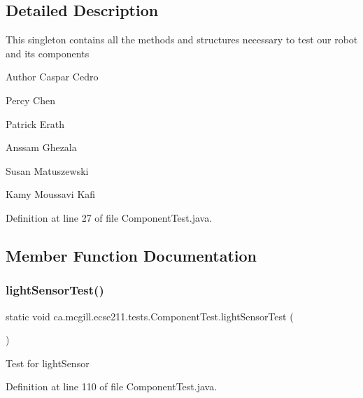\subsection{Detailed Description}
This singleton contains all the methods and structures necessary to test our robot and its components

\begin{DoxyAuthor}{Author}
Caspar Cedro 

Percy Chen 

Patrick Erath 

Anssam Ghezala 

Susan Matuszewski 

Kamy Moussavi Kafi 
\end{DoxyAuthor}


Definition at line 27 of file Component\+Test.\+java.



\subsection{Member Function Documentation}
\mbox{\label{enumca_1_1mcgill_1_1ecse211_1_1tests_1_1_component_test_a3e8288f482b3806a0f3c4668951f3e36}} 
\subsubsection{\texorpdfstring{light\+Sensor\+Test()}{lightSensorTest()}}
{\footnotesize\ttfamily static void ca.\+mcgill.\+ecse211.\+tests.\+Component\+Test.\+light\+Sensor\+Test (\begin{DoxyParamCaption}{ }\end{DoxyParamCaption})\hspace{0.3cm}{\ttfamily [static]}}

Test for light\+Sensor 

Definition at line 110 of file Component\+Test.\+java.



